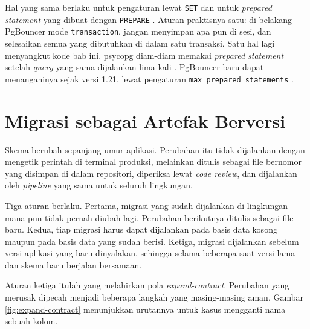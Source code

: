 Hal yang sama berlaku untuk pengaturan lewat \texttt{SET} dan untuk
\textit{prepared statement} yang dibuat dengan \texttt{PREPARE}
\cite{pgbouncer-features}. Aturan praktisnya satu: di belakang PgBouncer mode
\texttt{transaction}, jangan menyimpan apa pun di sesi, dan selesaikan semua
yang dibutuhkan di dalam satu transaksi. Satu hal lagi menyangkut kode bab ini.
psycopg diam-diam memakai \textit{prepared statement} setelah \textit{query} yang sama
dijalankan lima kali \cite{psycopg-prepare}. PgBouncer baru dapat menanganinya
sejak versi 1.21, lewat pengaturan \texttt{max\_prepared\_statements}
\cite{pgbouncer-config}.

\section{Migrasi sebagai Artefak Berversi}

Skema berubah sepanjang umur aplikasi. Perubahan itu tidak dijalankan dengan
mengetik perintah di terminal produksi, melainkan ditulis sebagai file
bernomor yang disimpan di dalam repositori, diperiksa lewat \textit{code
review}, dan dijalankan oleh \textit{pipeline} yang sama untuk seluruh
lingkungan.

Tiga aturan berlaku. Pertama, migrasi yang sudah dijalankan di lingkungan mana
pun tidak pernah diubah lagi. Perubahan berikutnya ditulis sebagai file baru.
Kedua, tiap migrasi harus dapat dijalankan pada basis data kosong maupun pada
basis data yang sudah berisi. Ketiga, migrasi dijalankan sebelum versi aplikasi
yang baru dinyalakan, sehingga selama beberapa saat versi lama dan skema baru
berjalan bersamaan.

Aturan ketiga itulah yang melahirkan pola \textit{expand-contract}. Perubahan
yang merusak dipecah menjadi beberapa langkah yang masing-masing aman. Gambar
\ref{fig:expand-contract} menunjukkan urutannya untuk kasus mengganti nama
sebuah kolom.

